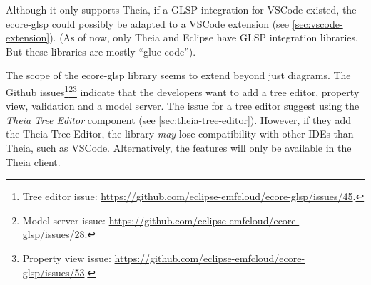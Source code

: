 Although it only supports \gls{Theia}, if a \gls{GLSP} integration for \gls{VSCode} existed, the ecore-glsp could possibly be adapted to a VSCode extension (see \cref{sec:vscode-extension}). (As of now, only \gls{Theia} and \gls{Eclipse} have \gls{GLSP} integration libraries. But these libraries are mostly ``glue code'').

The scope of the ecore-glsp library seems to extend beyond just diagrams.
The Github issues\footnote{Tree editor issue: \href{https://github.com/eclipse-emfcloud/ecore-glsp/issues/45}{https://github.com/eclipse-emfcloud/ecore-glsp/issues/45}.}\footnote{Model server issue: \href{https://github.com/eclipse-emfcloud/ecore-glsp/issues/28}{https://github.com/eclipse-emfcloud/ecore-glsp/issues/28}.}\footnote{Property view issue: \href{https://github.com/eclipse-emfcloud/ecore-glsp/issues/53}{https://github.com/eclipse-emfcloud/ecore-glsp/issues/53}.} indicate that the developers want to add a tree editor, property view, validation and a model server.
The issue for a tree editor suggest using the \emph{Theia Tree Editor} component (see \cref{sec:theia-tree-editor}).
However, if they add the Theia Tree Editor, the library \textit{may} lose compatibility with other \glspl{IDE} than \gls{Theia}, such as \gls{VSCode}.
Alternatively, the features will only be available in the \gls{Theia} client.

